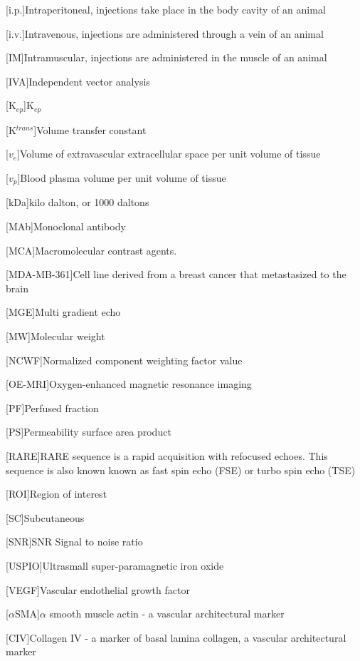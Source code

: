 \begin{acronym}
[i.p.]{Intraperitoneal, injections take place in the body cavity of an animal}

[i.v.]{Intravenous, injections are administered through a vein of an animal}

[IM]{Intramuscular, injections are administered in the muscle of an animal}

[IVA]{Independent vector analysis}

[K$_{ep}$]{K$_{ep}$}

[K$^{trans}$]{Volume transfer constant}

[$v_e$]{Volume of extravascular extracellular space per unit volume of tissue}

[$v_p$]{Blood plasma volume per unit volume of tissue}

[kDa]{kilo dalton, or 1000 daltons}

[MAb]{Monoclonal antibody}

[MCA]{Macromolecular contrast agents.}

[MDA-MB-361]{Cell line derived from a breast cancer that metastasized to the brain}

[MGE]{Multi gradient echo}

[MW]{Molecular weight}

[NCWF]{Normalized component weighting factor value}

[OE-MRI]{Oxygen-enhanced magnetic resonance imaging}

[PF]{Perfused fraction}

[PS]{Permeability surface area product}

[RARE]{RARE sequence is a rapid acquisition with refocused echoes. This sequence is also known known as fast spin echo (FSE) or turbo spin echo (TSE)}

[ROI]{Region of interest}

[SC]{Subcutaneous}

[SNR]{SNR Signal to noise ratio}

[USPIO]{Ultrasmall super-paramagnetic iron oxide}

[VEGF]{Vascular endothelial growth factor}

[$\alpha$SMA]{$\alpha$ smooth muscle actin - a vascular architectural marker}

[CIV]{Collagen IV - a marker of basal lamina collagen, a vascular architectural marker}


\end{acronym}

